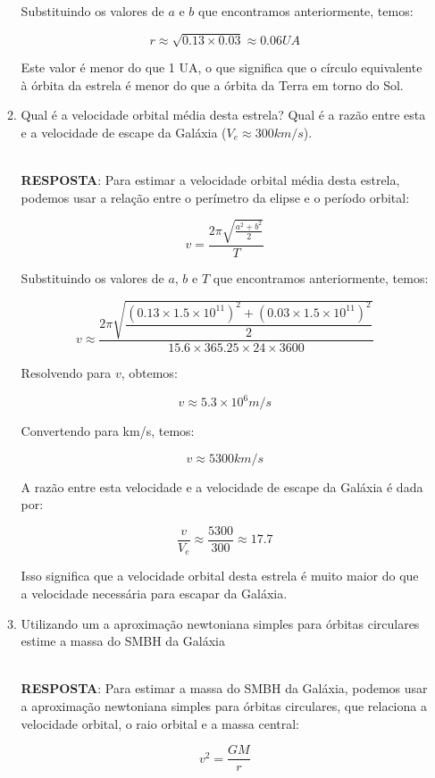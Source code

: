 \documentclass[a4paper,12pt]{article}
\begin{document}
\begin{enumerate}
\begin{enumerate}
Substituindo os valores de $a$ e $b$ que encontramos anteriormente, temos:

$$r \approx \sqrt{0.13 \times 0.03} \approx 0.06 UA$$

Este valor é menor do que 1 UA, o que significa que o círculo equivalente à órbita da estrela é menor do que a órbita da Terra em torno do Sol.

\noindent\hrulefill

\item Qual é a velocidade orbital média desta estrela? Qual é a razão entre esta e a velocidade de escape da Galáxia ($V_e\approx 300 km/s$). 

\noindent\hrulefill\\\textbf{RESPOSTA}: Para estimar a velocidade orbital média desta estrela, podemos usar a relação entre o perímetro da elipse e o período orbital:

$$v = \frac{2\pi\sqrt{\frac{a^2 + b^2}{2}}}{T}$$

Substituindo os valores de $a$, $b$ e $T$ que encontramos anteriormente, temos:

$$v \approx \dfrac{2\pi\sqrt{\dfrac{(0.13 \times 1.5 \times 10^{11})^2 + (0.03 \times 1.5 \times 10^{11})^2}{2}}}{15.6 \times 365.25 \times 24 \times 3600}$$

Resolvendo para $v$, obtemos:

$$v \approx 5.3 \times 10^6 m/s$$

Convertendo para km/s, temos:

$$v \approx 5300 km/s$$

A razão entre esta velocidade e a velocidade de escape da Galáxia é dada por:

$$\frac{v}{V_e} \approx \frac{5300}{300} \approx 17.7$$

Isso significa que a velocidade orbital desta estrela é muito maior do que a velocidade necessária para escapar da Galáxia.

\noindent\hrulefill

\item Utilizando um a aproximação newtoniana simples para órbitas circulares estime a massa do SMBH da Galáxia

\noindent\hrulefill\\\textbf{RESPOSTA}: Para estimar a massa do SMBH da Galáxia, podemos usar a aproximação newtoniana simples para órbitas circulares, que relaciona a velocidade orbital, o raio orbital e a massa central:

$$v^2 = \frac{GM}{r}$$


\end{enumerate}
\end{enumerate}
\end{document}
